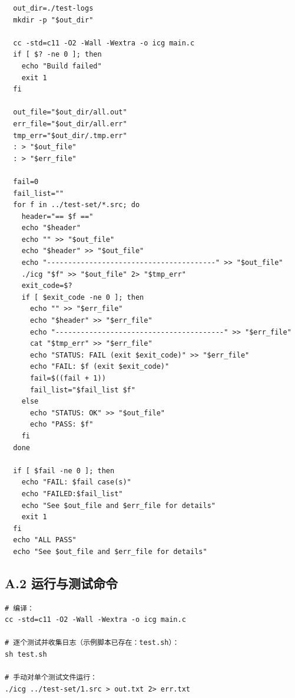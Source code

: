 \documentclass[12pt,a4paper]{ctexart}
\begin{document}
\begin{lstlisting}
  out_dir=./test-logs
  mkdir -p "$out_dir"

  cc -std=c11 -O2 -Wall -Wextra -o icg main.c
  if [ $? -ne 0 ]; then
    echo "Build failed"
    exit 1
  fi

  out_file="$out_dir/all.out"
  err_file="$out_dir/all.err"
  tmp_err="$out_dir/.tmp.err"
  : > "$out_file"
  : > "$err_file"

  fail=0
  fail_list=""
  for f in ../test-set/*.src; do
    header="== $f =="
    echo "$header"
    echo "" >> "$out_file"
    echo "$header" >> "$out_file"
    echo "----------------------------------------" >> "$out_file"
    ./icg "$f" >> "$out_file" 2> "$tmp_err"
    exit_code=$?
    if [ $exit_code -ne 0 ]; then
      echo "" >> "$err_file"
      echo "$header" >> "$err_file"
      echo "----------------------------------------" >> "$err_file"
      cat "$tmp_err" >> "$err_file"
      echo "STATUS: FAIL (exit $exit_code)" >> "$err_file"
      echo "FAIL: $f (exit $exit_code)"
      fail=$((fail + 1))
      fail_list="$fail_list $f"
    else
      echo "STATUS: OK" >> "$out_file"
      echo "PASS: $f"
    fi
  done

  if [ $fail -ne 0 ]; then
    echo "FAIL: $fail case(s)"
    echo "FAILED:$fail_list"
    echo "See $out_file and $err_file for details"
    exit 1
  fi
  echo "ALL PASS"
  echo "See $out_file and $err_file for details"
\end{lstlisting}

\subsection*{A.2 运行与测试命令}
\begin{verbatim}
# 编译：
cc -std=c11 -O2 -Wall -Wextra -o icg main.c

# 逐个测试并收集日志（示例脚本已存在：test.sh）：
sh test.sh

# 手动对单个测试文件运行：
./icg ../test-set/1.src > out.txt 2> err.txt
\end{verbatim}
\end{document}
